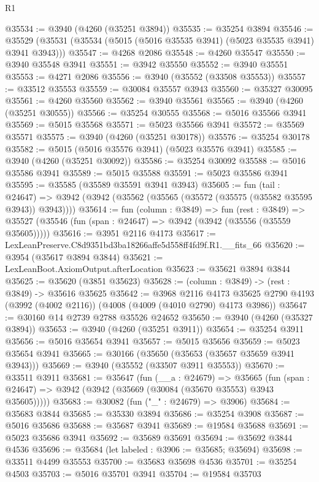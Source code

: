 \begin{lexlean}{R1}
\begin{coremodule}
@35534 := @3940 (@4260 (@35251 @3894))
@35535 := @35254 @3894
@35546 := @35529 (@35531 (@35534 (@5015 (@5016 @35535 @3941) (@5023 @35535 @3941) @3941 @3943)))
@35547 := @4268 @2086
@35548 := @4260 @35547
@35550 := @3940 @35548 @3941
@35551 := @3942 @35550
@35552 := @3940 @35551
@35553 := @4271 @2086
@35556 := @3940 (@35552 (@33508 @35553))
@35557 := @33512 @35553
@35559 := @30084 @35557 @3943
@35560 := @35327 @30095
@35561 := @4260 @35560
@35562 := @3940 @35561
@35565 := @3940 (@4260 (@35251 @30555))
@35566 := @35254 @30555
@35568 := @5016 @35566 @3941
@35569 := @5015 @35568
@35571 := @5023 @35566 @3941
@35572 := @35569 @35571
@35575 := @3940 (@4260 (@35251 @30178))
@35576 := @35254 @30178
@35582 := @5015 (@5016 @35576 @3941) (@5023 @35576 @3941)
@35585 := @3940 (@4260 (@35251 @30092))
@35586 := @35254 @30092
@35588 := @5016 @35586 @3941
@35589 := @5015 @35588
@35591 := @5023 @35586 @3941
@35595 := @35585 (@35589 @35591 @3941 @3943)
@35605 := fun (tail : @24647) =>
  @3942 (@3942 (@35562 (@35565 (@35572 (@35575 (@35582 @35595 @3943)) @3943))))
@35614 := fun (column : @3849) =>
  fun (rest : @3849) =>
  @35527 (@35546 (fun (span : @24647) => @3942 (@3942 (@35556 (@35559 @35605)))))
@35616 := @3951 @2116 @4173
@35617 := LexLeanPreserve.C8d9351bd3ba18266affe5d558ff4fd9f.R1.__fits_66
@35620 := @3954 (@35617 @3894 @3844)
@35621 := LexLeanBoot.AxiomOutput.afterLocation
@35623 := @35621 @3894 @3844
@35625 := @35620 (@3851 @35623)
@35628 := (column : @3849) -> (rest : @3849) -> @35616 @35625
@35642 := @3968
    @2116
    @4173
    @35625
    @2790
    @4193
    (@3992 (@4002 @2116))
    (@4008 (@4009 (@4010 @2790) @4173 @3986))
@35647 := @30160 @14 @2739 @2788 @35526 @24652
@35650 := @3940 (@4260 (@35327 @3894))
@35653 := @3940 (@4260 (@35251 @3911))
@35654 := @35254 @3911
@35656 := @5016 @35654 @3941
@35657 := @5015 @35656
@35659 := @5023 @35654 @3941
@35665 := @30166 (@35650 (@35653 (@35657 @35659 @3941 @3943)))
@35669 := @3940 (@35552 (@33507 @3911 @35553))
@35670 := @33511 @3911
@35681 := @35647
    (fun (__a : @24679) =>
    @35665 (fun (span : @24647) => @3942 (@3942 (@35669 (@30084 (@35670 @35553) @3943 @35605)))))
@35683 := @30082 (fun ("_" : @24679) => @3906)
@35684 := @35683 @3844
@35685 := @35330 @3894
@35686 := @35254 @3908
@35687 := @5016 @35686
@35688 := @35687 @3941
@35689 := @19584 @35688
@35691 := @5023 @35686 @3941
@35692 := @35689 @35691
@35694 := @35692 @3844 @4536
@35696 := @35684 (let labeled : @3906 := @35685; @35694)
@35698 := @33511 @4499 @35553
@35700 := @35683 @35698 @4536
@35701 := @35254 @4503
@35703 := @5016 @35701 @3941
@35704 := @19584 @35703

\end{coremodule}
\end{lexlean}
